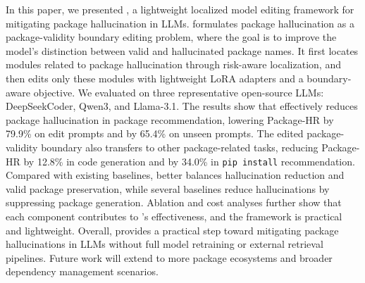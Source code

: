 
In this paper, we presented \textbf{\appname}, a lightweight localized model editing framework for mitigating package hallucination in LLMs. 
\appname formulates package hallucination as a package-validity boundary editing problem, where the goal is to improve the model's distinction between valid and hallucinated package names. 
It first locates modules related to package hallucination through risk-aware localization, and then edits only these modules with lightweight LoRA adapters and a boundary-aware objective.
We evaluated \appname on three representative open-source LLMs: DeepSeekCoder, Qwen3, and Llama-3.1. 
The results show that \appname effectively reduces package hallucination in package recommendation, lowering Package-HR by 79.9\% on edit prompts and by 65.4\% on unseen prompts. 
The edited package-validity boundary also transfers to other package-related tasks, reducing Package-HR by 12.8\% in code generation and by 34.0\% in \texttt{pip install} recommendation. 
Compared with existing baselines, \appname better balances hallucination reduction and valid package preservation, while several baselines reduce hallucinations by suppressing package generation.
Ablation and cost analyses further show that each component contributes to \appname's effectiveness, and the framework is practical and lightweight. 
Overall, \appname provides a practical step toward mitigating package hallucinations in LLMs without full model retraining or external retrieval pipelines. 
Future work will extend \appname to more package ecosystems and broader dependency management scenarios.